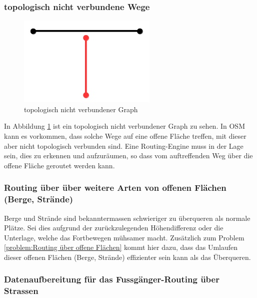 \subsubsection{topologisch nicht verbundene Wege}
\label{problem:topologisch nicht verbundene Wege}

\begin{figure}[ht]
\centering
\includegraphics[width=0.5\linewidth]{technicalreport/img/topologisch_nicht_verbundener_graph}
\caption[topologisch nicht verbundener Graph]{topologisch nicht verbundener Graph}
\label{fig:topologisch_nicht_verbundener_graph}
\end{figure}

In Abbildung \ref{fig:topologisch_nicht_verbundener_graph} ist ein topologisch nicht verbundener Graph zu sehen. In \ac{OSM} kann es vorkommen, dass solche Wege auf eine offene Fläche treffen, mit dieser aber nicht topologisch verbunden sind. Eine Routing-Engine muss in der Lage sein, dies zu erkennen und aufzuräumen, so dass vom auftreffenden Weg über die offene Fläche geroutet werden kann.

\subsubsection{Routing über über weitere Arten von offenen Flächen (Berge, Strände)}
\label{problem:Routing über über weitere Arten von offenen Flächen (Berge, Strände)}
Berge und Strände sind bekanntermassen schwieriger zu überqueren als normale Plätze. Sei dies aufgrund der zurückzulegenden Höhendifferenz oder die Unterlage, welche das Fortbewegen mühsamer macht. Zusätzlich zum Problem \ref{problem:Routing über offene Flächen} kommt hier dazu, dass das Umlaufen dieser offenen Flächen (Berge, Strände) effizienter sein kann als das Überqueren.

\subsubsection{Datenaufbereitung für das Fussgänger-Routing über Strassen}
\label{problem:Datenaufbereitung für das Fussgänger-Routing über Strassen}

